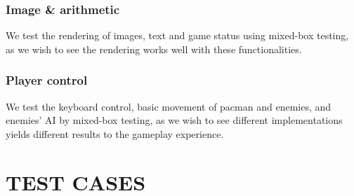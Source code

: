 \documentclass[11pt]{article}
\begin{document}
    \subsubsection*{Image \& arithmetic}
    We test the rendering of images, text and game status using mixed-box testing, as we wish to see the rendering works well with these functionalities.

    \subsubsection*{Player control}
    We test the keyboard control, basic movement of pacman and enemies, and enemies' AI by mixed-box testing, as we wish to see different implementations yields different results to the gameplay experience.
    \section{TEST CASES}
\end{document}
